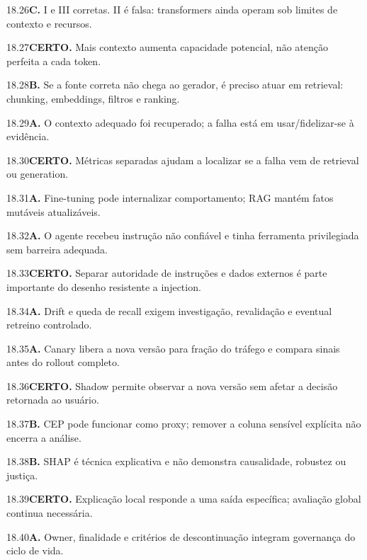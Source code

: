 \begin{solucao}{18.26}\textbf{C.} I e III corretas. II é falsa: transformers ainda operam sob limites de contexto e recursos.\end{solucao}
\begin{solucao}{18.27}\textbf{CERTO.} Mais contexto aumenta capacidade potencial, não atenção perfeita a cada token.\end{solucao}
\begin{solucao}{18.28}\textbf{B.} Se a fonte correta não chega ao gerador, é preciso atuar em retrieval: chunking, embeddings, filtros e ranking.\end{solucao}
\begin{solucao}{18.29}\textbf{A.} O contexto adequado foi recuperado; a falha está em usar/fidelizar-se à evidência.\end{solucao}
\begin{solucao}{18.30}\textbf{CERTO.} Métricas separadas ajudam a localizar se a falha vem de retrieval ou generation.\end{solucao}
\begin{solucao}{18.31}\textbf{A.} Fine-tuning pode internalizar comportamento; RAG mantém fatos mutáveis atualizáveis.\end{solucao}
\begin{solucao}{18.32}\textbf{A.} O agente recebeu instrução não confiável e tinha ferramenta privilegiada sem barreira adequada.\end{solucao}
\begin{solucao}{18.33}\textbf{CERTO.} Separar autoridade de instruções e dados externos é parte importante do desenho resistente a injection.\end{solucao}
\begin{solucao}{18.34}\textbf{A.} Drift e queda de recall exigem investigação, revalidação e eventual retreino controlado.\end{solucao}
\begin{solucao}{18.35}\textbf{A.} Canary libera a nova versão para fração do tráfego e compara sinais antes do rollout completo.\end{solucao}
\begin{solucao}{18.36}\textbf{CERTO.} Shadow permite observar a nova versão sem afetar a decisão retornada ao usuário.\end{solucao}
\begin{solucao}{18.37}\textbf{B.} CEP pode funcionar como proxy; remover a coluna sensível explícita não encerra a análise.\end{solucao}
\begin{solucao}{18.38}\textbf{B.} SHAP é técnica explicativa e não demonstra causalidade, robustez ou justiça.\end{solucao}
\begin{solucao}{18.39}\textbf{CERTO.} Explicação local responde a uma saída específica; avaliação global continua necessária.\end{solucao}
\begin{solucao}{18.40}\textbf{A.} Owner, finalidade e critérios de descontinuação integram governança do ciclo de vida.\end{solucao}

